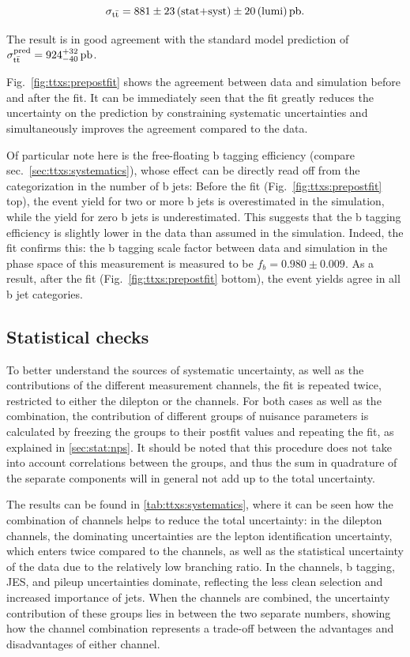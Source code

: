 \[
    \sigma_{\mathrm{t \bar{t}}} = 881 \pm 23 \, \text{(stat+syst)} \pm 20 \, \text{(lumi)} \, \text{pb}.
\]

The result is in good agreement with the standard model prediction of $\sigma_{\mathrm{t \bar{t}}}^{\text{pred}} = 924^{+32}_{-40} \, \text{pb}$.

Fig.~\ref{fig:ttxs:prepostfit} shows the agreement between data and simulation before and after the fit. It can be immediately seen that the fit greatly reduces the uncertainty on the prediction by constraining systematic uncertainties and simultaneously improves the agreement compared to the data. 

Of particular note here is the free-floating b tagging efficiency (compare sec.~\ref{sec:ttxs:systematics}), whose effect can be directly read off from the categorization in the number of b jets: Before the fit (Fig.~\ref{fig:ttxs:prepostfit} top), the event yield for two or more b jets is overestimated in the simulation, while the yield for zero b jets is underestimated. This suggests that the b tagging efficiency is slightly lower in the data than assumed in the simulation. Indeed, the fit confirms this: the b tagging scale factor between data and simulation in the phase space of this measurement is measured to be $f_b  = 0.980 \pm 0.009$. As a result, after the fit (Fig.~\ref{fig:ttxs:prepostfit} bottom), the event yields agree in all b jet categories.

\subsection{Statistical checks}

To better understand the sources of systematic uncertainty, as well as the contributions of the different measurement channels, the fit is repeated twice, restricted to either the dilepton or the \ljets channels. For both cases as well as the combination, the contribution of different groups of nuisance parameters is calculated by freezing the groups to their postfit values and repeating the fit, as explained in \cref{sec:stat:nps}. It should be noted that this procedure does not take into account correlations between the groups, and thus the sum in quadrature of the separate components will in general not add up to the total uncertainty.

The results can be found in \cref{tab:ttxs:systematics}, where it can be seen how the combination of channels helps to reduce the total uncertainty: in the dilepton channels, the dominating uncertainties are the lepton identification uncertainty, which enters twice compared to the \ljets channels, as well as the statistical uncertainty of the data due to the relatively low branching ratio. In the \ljets channels, b tagging, JES, and pileup uncertainties dominate, reflecting the less clean selection and increased importance of jets. When the channels are combined, the uncertainty contribution of these groups lies in between the two separate numbers, showing how the channel combination represents a trade-off between the advantages and disadvantages of either channel.

